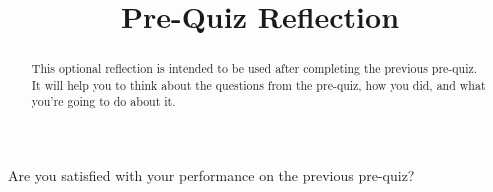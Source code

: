 \documentclass{ximera}
\title{Pre-Quiz Reflection}
\begin{document}
\begin{abstract}
This optional reflection is intended to be used after completing the previous pre-quiz.  It will help you to think about the questions from the pre-quiz, how you did, and what you're going to do about it. 
\end{abstract}
\maketitle

\begin{question}
    Are you satisfied with your performance on the previous pre-quiz?

  \begin{multipleChoice}
  \end{multipleChoice}
\end{question}
\end{document}
